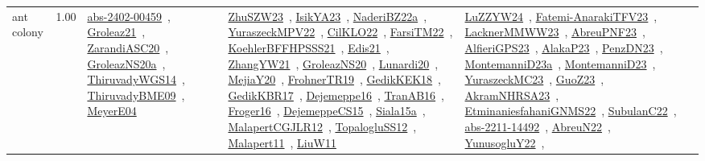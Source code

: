 {\begin{longtable}{p{3cm}r>{\raggedright\arraybackslash}p{6cm}>{\raggedright\arraybackslash}p{6cm}>{\raggedright\arraybackslash}p{8cm}}
\index{ant colony}\index{Algorithms!ant colony}ant colony &  1.00 & \href{../works/abs-2402-00459.pdf}{abs-2402-00459}~\cite{abs-2402-00459}, \href{../works/Groleaz21.pdf}{Groleaz21}~\cite{Groleaz21}, \href{../works/ZarandiASC20.pdf}{ZarandiASC20}~\cite{ZarandiASC20}, \href{../works/GroleazNS20a.pdf}{GroleazNS20a}~\cite{GroleazNS20a}, \href{../works/ThiruvadyWGS14.pdf}{ThiruvadyWGS14}~\cite{ThiruvadyWGS14}, \href{../works/ThiruvadyBME09.pdf}{ThiruvadyBME09}~\cite{ThiruvadyBME09}, \href{../works/MeyerE04.pdf}{MeyerE04}~\cite{MeyerE04} & \href{../works/ZhuSZW23.pdf}{ZhuSZW23}~\cite{ZhuSZW23}, \href{../works/IsikYA23.pdf}{IsikYA23}~\cite{IsikYA23}, \href{../works/NaderiBZ22a.pdf}{NaderiBZ22a}~\cite{NaderiBZ22a}, \href{../works/YuraszeckMPV22.pdf}{YuraszeckMPV22}~\cite{YuraszeckMPV22}, \href{../works/CilKLO22.pdf}{CilKLO22}~\cite{CilKLO22}, \href{../works/FarsiTM22.pdf}{FarsiTM22}~\cite{FarsiTM22}, \href{../works/KoehlerBFFHPSSS21.pdf}{KoehlerBFFHPSSS21}~\cite{KoehlerBFFHPSSS21}, \href{../works/Edis21.pdf}{Edis21}~\cite{Edis21}, \href{../works/ZhangYW21.pdf}{ZhangYW21}~\cite{ZhangYW21}, \href{../works/GroleazNS20.pdf}{GroleazNS20}~\cite{GroleazNS20}, \href{../works/Lunardi20.pdf}{Lunardi20}~\cite{Lunardi20}, \href{../works/MejiaY20.pdf}{MejiaY20}~\cite{MejiaY20}, \href{../works/FrohnerTR19.pdf}{FrohnerTR19}~\cite{FrohnerTR19}, \href{../works/GedikKEK18.pdf}{GedikKEK18}~\cite{GedikKEK18}, \href{../works/GedikKBR17.pdf}{GedikKBR17}~\cite{GedikKBR17}, \href{../works/Dejemeppe16.pdf}{Dejemeppe16}~\cite{Dejemeppe16}, \href{../works/TranAB16.pdf}{TranAB16}~\cite{TranAB16}, \href{../works/Froger16.pdf}{Froger16}~\cite{Froger16}, \href{../works/DejemeppeCS15.pdf}{DejemeppeCS15}~\cite{DejemeppeCS15}, \href{../works/Siala15a.pdf}{Siala15a}~\cite{Siala15a}, \href{../works/MalapertCGJLR12.pdf}{MalapertCGJLR12}~\cite{MalapertCGJLR12}, \href{../works/TopalogluSS12.pdf}{TopalogluSS12}~\cite{TopalogluSS12}, \href{../works/Malapert11.pdf}{Malapert11}~\cite{Malapert11}, \href{../works/LiuW11.pdf}{LiuW11}~\cite{LiuW11} & \href{../works/LuZZYW24.pdf}{LuZZYW24}~\cite{LuZZYW24}, \href{../works/Fatemi-AnarakiTFV23.pdf}{Fatemi-AnarakiTFV23}~\cite{Fatemi-AnarakiTFV23}, \href{../works/LacknerMMWW23.pdf}{LacknerMMWW23}~\cite{LacknerMMWW23}, \href{../works/AbreuPNF23.pdf}{AbreuPNF23}~\cite{AbreuPNF23}, \href{../works/AlfieriGPS23.pdf}{AlfieriGPS23}~\cite{AlfieriGPS23}, \href{../works/AlakaP23.pdf}{AlakaP23}~\cite{AlakaP23}, \href{../works/PenzDN23.pdf}{PenzDN23}~\cite{PenzDN23}, \href{../works/MontemanniD23a.pdf}{MontemanniD23a}~\cite{MontemanniD23a}, \href{../works/MontemanniD23.pdf}{MontemanniD23}~\cite{MontemanniD23}, \href{../works/YuraszeckMC23.pdf}{YuraszeckMC23}~\cite{YuraszeckMC23}, \href{../works/GuoZ23.pdf}{GuoZ23}~\cite{GuoZ23}, \href{../works/AkramNHRSA23.pdf}{AkramNHRSA23}~\cite{AkramNHRSA23}, \href{../works/EtminaniesfahaniGNMS22.pdf}{EtminaniesfahaniGNMS22}~\cite{EtminaniesfahaniGNMS22}, \href{../works/SubulanC22.pdf}{SubulanC22}~\cite{SubulanC22}, \href{../works/abs-2211-14492.pdf}{abs-2211-14492}~\cite{abs-2211-14492}, \href{../works/AbreuN22.pdf}{AbreuN22}~\cite{AbreuN22}, \href{../works/YunusogluY22.pdf}{YunusogluY22}~\cite{YunusogluY22}, 
\end{longtable}}
